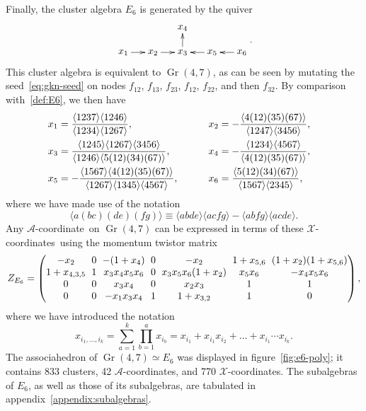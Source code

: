 \documentclass[11pt]{article}
\DeclareMathOperator{\Gr}{Gr}
\def\ket#1{\langle #1 \rangle}
\def\xcoords{$\mathcal{X}$-coordinates}
\def\acoord{$\mathcal{A}$-coordinate}
\def\acoords{$\mathcal{A}$-coordinates}
\begin{document}
Finally, the cluster algebra $E_6$ is generated by the quiver
\begin{equation}\label{def:E6}
    \begin{gathered}
    \begin{xy} 0;<1pt,0pt>:<0pt,-1pt>::
      (0,0) *+{x_1} ="1",
      (30,0) *+{x_2} ="2",
      (60,0) *+{x_3} ="3",
      (60,-25) *+{x_4} ="4",
      (90,0) *+{x_5} ="5",
      (120,0) *+{x_6} ="6",
      "1", {\ar"2"},
      "2", {\ar"3"},
      "3", {\ar"4"},
      "5", {\ar"3"},
      "6", {\ar"5"},
    \end{xy}
    \end{gathered} .
\end{equation}
This cluster algebra is equivalent to $\Gr(4,7)$, as can be seen by mutating the seed~\eqref{eq:gkn-seed} on nodes $f_{12}$, $f_{13}$, $f_{23}$, $f_{12}$, $f_{22}$, and then $f_{32}$. By comparison with~\eqref{def:E6}, we then have 
\begin{align} \label{eq:E6_x_def}
x_1 &= \frac{\ket{1237} \ket{1246}}{\ket{1234}\ket{1267}}, \hspace{13.03ex} \quad \quad x_2 = - \frac{\ket{4(12)(35)(67)}}{\ket{1247} \ket{3456}}, \quad \nonumber \\
x_3 &= \frac{\ket{1245} \ket{1267} \ket{3456}}{\ket{1246} \ket{5(12)(34)(67)}}, \hspace{4.12ex} \quad \quad x_4 = -\frac{\ket{1234} \ket{4567}}{\ket{4(12)(35)(67)}}, \quad \\
 x_5 &= -\frac{\ket{1567}\ket{4(12)(35)(67)}}{\ket{1267} \ket{1345}\ket{4567}}, \quad \quad \quad x_6 = \frac{\ket{5(12)(34)(67)}}{\ket{1567}\ket{2345}}, \quad \nonumber
\end{align}
where we have made use of the notation
\begin{equation} \label{eq:twistor_intersection}
\ket{a(bc)(de)(fg)} \equiv \ket{abde}\ket{acfg}-\ket{abfg}\ket{acde}.
\end{equation}
Any \acoord\ on $\Gr(4,7)$ can be expressed in terms of these \xcoords\ using the momentum twistor matrix 
\begin{equation}
Z_{E_6} = 
\begingroup
\setlength\arraycolsep{3pt}
\begin{pmatrix} 
 -x_2 & 0 & -(1+x_4) & 0 & -x_2 & 1+x_{5,6} & (1+x_2) (1+x_{5,6}) \\
 1+x_{4,3,5} & 1 & x_3 x_4 x_5 x_6 & 0 & x_3 x_5 x_6 (1+x_2) & x_5 x_6 & -x_4 x_5 x_6 \\
 0 & 0 & x_3 x_4 & 0 & x_2 x_3 & 1 & 1 \\
 0 & 0 & -x_1 x_3 x_4 & 1 & 1+x_{3,2} & 1 & 0 \\
\end{pmatrix} ,
\endgroup
\end{equation}
where we have introduced the notation
\begin{equation} \label{eq:compound_x_def}
	x_{i_1,\ldots, i_k} = \sum_{a=1}^k \prod_{b=1}^a x_{i_b} = x_{i_1}+x_{i_1}x_{i_2} + \ldots + x_{i_1}\cdots x_{i_k}.
\end{equation}
The associahedron of $\Gr(4,7) \simeq E_6$ was displayed in figure~\ref{fig:e6-poly}; it contains 833 clusters, 42 \acoords, and 770 \xcoords. The subalgebras of $E_6$, as well as those of its subalgebras, are tabulated in appendix~\ref{appendix:subalgebras}.
\end{document}
